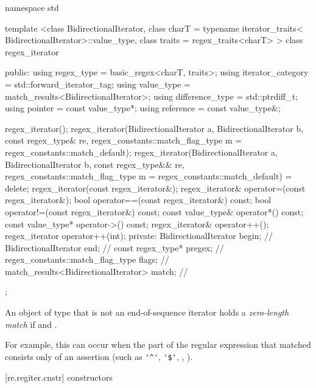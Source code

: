 \begin{codeblock}
namespace std {
  template <class BidirectionalIterator, 
            class charT = typename iterator_traits<
              BidirectionalIterator>::value_type,
              class traits = regex_traits<charT> >
  class regex_iterator {
  public:
     using regex_type        = basic_regex<charT, traits>;
     using iterator_category = std::forward_iterator_tag;
     using value_type        = match_results<BidirectionalIterator>;
     using difference_type   = std::ptrdiff_t;
     using pointer           = const value_type*;
     using reference         = const value_type&;

     regex_iterator();
     regex_iterator(BidirectionalIterator a, BidirectionalIterator b, 
                    const regex_type& re, 
                    regex_constants::match_flag_type m =
                      regex_constants::match_default);
     regex_iterator(BidirectionalIterator a, BidirectionalIterator b,
                    const regex_type&& re,
                    regex_constants::match_flag_type m =
                      regex_constants::match_default) = delete;
     regex_iterator(const regex_iterator&);
     regex_iterator& operator=(const regex_iterator&);
     bool operator==(const regex_iterator&) const;
     bool operator!=(const regex_iterator&) const;
     const value_type& operator*() const;
     const value_type* operator->() const;
     regex_iterator& operator++();
     regex_iterator operator++(int);
  private:
     BidirectionalIterator                begin;  // \expos
     BidirectionalIterator                end;    // \expos
     const regex_type*                    pregex; // \expos
     regex_constants::match_flag_type     flags;  // \expos
     match_results<BidirectionalIterator> match;  // \expos
  }; 
}
\end{codeblock}

\pnum
{}%
An object of type  that is not an end-of-sequence iterator
holds a \textit{zero-length match} if  and
. \begin{note} For
example, this can occur when the part of the regular expression that
matched consists only of an assertion (such as \verb|'^'|, \verb|'$'|, 
, ). \end{note}

[re.regiter.cnstr]{ constructors}

